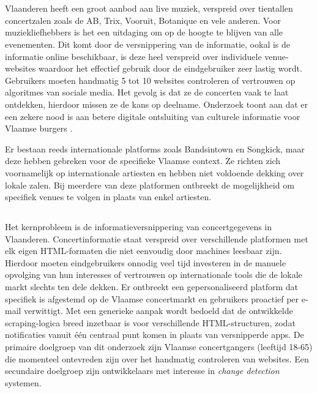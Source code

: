
\chapter{}%
\label{ch:inleiding}

Vlaanderen heeft een groot aanbod aan live muziek, verspreid over tientallen concertzalen zoals de AB, Trix, Vooruit, Botanique en vele anderen. Voor muziekliefhebbers is het een uitdaging om op de hoogte te blijven van alle evenementen. Dit komt door de versnippering van de informatie, ookal is de informatie online beschikbaar, is deze heel verspreid over individuele venue-websites waardoor het effectief gebruik door de eindgebruiker zeer lastig wordt. Gebruikers moeten handmatig 5 tot 10 websites controleren of vertrouwen op algoritmes van sociale media. \newline
Het gevolg is dat ze de concerten vaak te laat ontdekken, hierdoor missen ze de kans op deelname. Onderzoek toont aan dat er een zekere nood is aan betere digitale ontsluiting van culturele informatie voor Vlaamse burgers \autocite{Rutten2018}.

Er bestaan reeds internationale platforms zoals Bandsintown en Songkick, maar deze hebben gebreken voor de specifieke Vlaamse context. Ze richten zich voornamelijk op internationale artiesten en hebben niet voldoende dekking over lokale zalen. Bij meerdere van deze platformen ontbreekt de mogelijkheid om specifiek venues te volgen in plaats van enkel artiesten.

\section{}%
\label{sec:probleemstelling}

Het kernprobleem is de informatieversnippering van concertgegevens in Vlaanderen. Concertinformatie staat verspreid over verschillende platformen met elk eigen HTML-formaten die niet eenvoudig door machines leesbaar zijn. Hierdoor moeten eindgebruikers onnodig veel tijd investeren in de manuele opvolging van hun interesses of vertrouwen op internationale tools die de lokale markt slechts ten dele dekken. 
Er ontbreekt een gepersonaliseerd platform dat specifiek is afgestemd op de Vlaamse concertmarkt en gebruikers proactief per e-mail verwittigt. Met een generieke aanpak wordt bedoeld dat de ontwikkelde scraping-logica breed inzetbaar is voor verschillende HTML-structuren, zodat notificaties vanuit één centraal punt komen in plaats van versnipperde apps.
De primaire doelgroep van dit onderzoek zijn Vlaamse concertgangers (leeftijd 18-65) die momenteel ontevreden zijn over het handmatig controleren van websites. Een secundaire doelgroep zijn ontwikkelaars met interesse in \textit{change detection} systemen.

